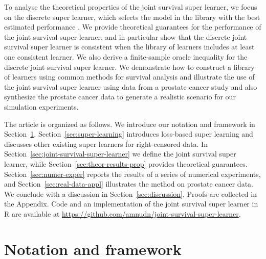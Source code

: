 \documentclass[alpha-refs]{wiley-article}
\newcommand{\1}{\mathbb{1}}
\begin{document}
To analyse the theoretical properties of the joint survival super
learner, we focus on the discrete super learner, which selects the
model in the library with the best estimated performance
\citep{van2007super}. We provide theoretical guarantees for the
performance of the joint survival super learner, and in particular
show that the discrete joint survival super learner is consistent when
the library of learners includes at least one consistent learner. We
also derive a finite-sample oracle inequality for the discrete joint
survival super learner. We demonstrate how to construct a library of
learners using common methods for survival analysis and illustrate the
use of the joint survival super learner using data from a prostate
cancer study \cite{kattan2000pretreatment} and also synthesize the
prostate cancer data to generate a realistic scenario for our
simulation experiments.

The article is organized as follows. We introduce our notation and
framework in Section~\ref{sec:framework}.
Section~\ref{sec:super-learning} introduces loss-based super learning
and discusses other existing super learners for right-censored
data. In Section~\ref{sec:joint-survival-super-learner} we define the joint
survival super learner, while Section~\ref{sec:theor-results-prop}
provides theoretical guarantees. Section~\ref{sec:numer-exper} reports
the results of a series of numerical experiments, and
Section~\ref{sec:real-data-appl} illustrates the method on prostate
cancer data. We conclude with a discussion in
Section~\ref{sec:discussion}. Proofs are collected in the
Appendix. Code and an implementation of the joint survival super
learner in R \citep{R} are available at
\url{https://github.com/amnudn/joint-survival-super-learner}.

\section{Notation and framework}
\label{sec:framework}
\end{document}
